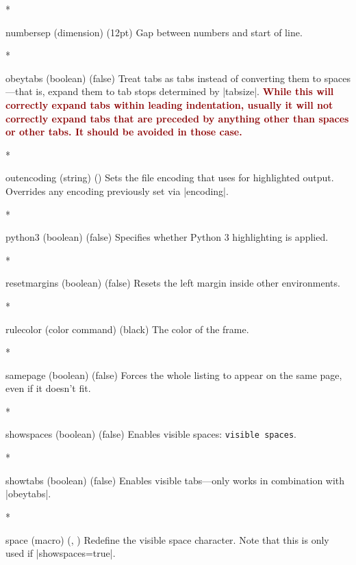 \begin{paracol}{2}
\begin{optionlist}
\switchcolumn[0]*%
  \item[numbersep (dimension) (12pt)]
    Gap between numbers and start of line.
    \switchcolumn

\switchcolumn[0]*%
  \item[obeytabs (boolean) (false)]
    Treat tabs as tabs instead of converting them to spaces---that is, expand them to tab stops determined by |tabsize|.  \textcolor{DarkRed}{\textbf{While this will correctly expand tabs within leading indentation, usually it will not correctly expand tabs that are preceded by anything other than spaces or other tabs.  It should be avoided in those case.}}
    \switchcolumn

    \switchcolumn[0]*%
  \item[outencoding (string) (\meta{system-specific})]
    Sets the file encoding that  uses for highlighted output.  Overrides any encoding previously set via |encoding|.
    \switchcolumn

\switchcolumn[0]*%
  \item[python3 (boolean) (false)] 
    Specifies whether Python 3 highlighting is applied.
    \switchcolumn

\switchcolumn[0]*%
  \item[resetmargins (boolean) (false)]
    Resets the left margin inside other environments.
    \switchcolumn

\switchcolumn[0]*%
  \item[rulecolor (color command) (black)]
    The color of the frame.
    \switchcolumn

\switchcolumn[0]*%
  \item[samepage (boolean) (false)]
    Forces the whole listing to appear on the same page, even if it doesn't fit.
    \switchcolumn

\switchcolumn[0]*%
  \item[showspaces (boolean) (false)]
    Enables visible spaces: \verb*/visible spaces/.
    \switchcolumn

\switchcolumn[0]*%
  \item[showtabs (boolean) (false)]
    Enables visible tabs---only works in combination with |obeytabs|.
    \switchcolumn

    \switchcolumn[0]*%

\item[space (macro) (\string\textvisiblespace, \textvisiblespace)]
Redefine the visible space character.  Note that this is only used if |showspaces=true|.
\switchcolumn


\end{optionlist}
\end{paracol}
